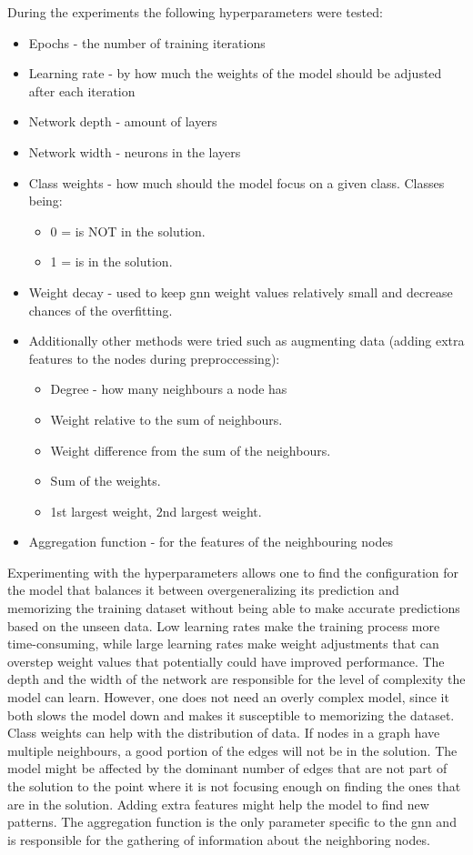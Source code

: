 During the experiments the following hyperparameters were tested:
\begin{itemize}
\item Epochs - the number of training iterations
\item Learning rate - by how much the weights of the model should be adjusted after each iteration
\item Network depth - amount of layers 
\item Network width - neurons in the layers
\item Class weights - how much should the model focus on a given class. Classes being: 
	\begin{itemize}
	\item 0 = is NOT in the solution.
	\item 1 = is in the solution.
	\end{itemize}	
\item Weight decay - used to keep \gls{gnn} weight values relatively small and decrease chances of the overfitting. 

\item Additionally other methods were tried such as augmenting data (adding extra features to the nodes during preproccessing): 
	\begin{itemize}
	\item Degree - how many neighbours a node has
	\item Weight relative to the sum of neighbours.
	\item Weight difference from the sum of the neighbours.
	\item Sum of the weights. 
	\item 1st largest weight, 2nd largest weight.
	\end{itemize}

\item Aggregation function - for the features of the neighbouring nodes 
\end{itemize}

Experimenting with the hyperparameters allows one to find the configuration for the model that balances it between overgeneralizing its prediction and memorizing the training dataset without being able to make accurate predictions based on the unseen data. Low learning rates make the training process more time-consuming, while large learning rates make weight adjustments that can overstep weight values that potentially could have improved performance. The depth and the width of the network are responsible for the level of complexity the model can learn. However, one does not need an overly complex model, since it both slows the model down and makes it susceptible to memorizing the dataset. Class weights can help with the distribution of data. If nodes in a graph have multiple neighbours, a good portion of the edges will not be in the solution. The model might be affected by the dominant number of edges that are not part of the solution to the point where it is not focusing enough on finding the ones that are in the solution. Adding extra features might help the model to find new patterns. The aggregation function is the only parameter specific to the \gls{gnn} and is responsible for the gathering of information about the neighboring nodes.

